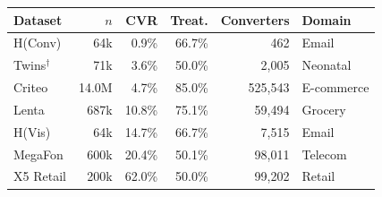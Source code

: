\begin{tabular}{lrrrrl}
\toprule
Dataset & $n$ & CVR & Treat. & Converters & Domain \\
\midrule
H(Conv) \citep{hillstrom2008} & 64k & 0.9\% & 66.7\% & 462 & Email \\
Twins$^\dagger$ \citep{louizos2017} & 71k & 3.6\% & 50.0\% & 2{,}005 & Neonatal \\
Criteo \citep{diemert2018} & 14.0M & 4.7\% & 85.0\% & 525{,}543 & E-commerce \\
Lenta \citeyearpar{lenta2021} & 687k & 10.8\% & 75.1\% & 59{,}494 & Grocery \\
H(Vis) \citep{hillstrom2008} & 64k & 14.7\% & 66.7\% & 7{,}515 & Email \\
MegaFon \citeyearpar{megafon2019} & 600k & 20.4\% & 50.1\% & 98{,}011 & Telecom \\
X5 Retail \citeyearpar{x5retail2020} & 200k & 62.0\% & 50.0\% & 99{,}202 & Retail \\
\bottomrule
\end{tabular}
